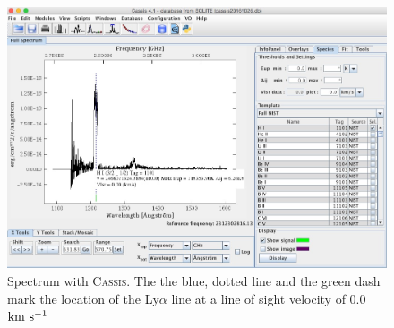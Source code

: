 \documentclass [a4paper, 12pt]{article}
\def\kms{\rm km\ s^{-1}}
\newcommand{\cassis}{{\textsc{Cassis}}}
\begin{document}
\begin{itemize}
\begin{figure}[H]
\center
\includegraphics[width=0.6  \textwidth]{../images/cassis_display_spectrum-2.jpg}
\caption{Spectrum with \cassis. The the blue, dotted line and the green dash 
mark the location of the Ly$\alpha$ line at a line of sight velocity of 
0.0\,$\kms$}
\label{fig:spectrum2}
\end{figure}


\end{itemize}
\end{document}
